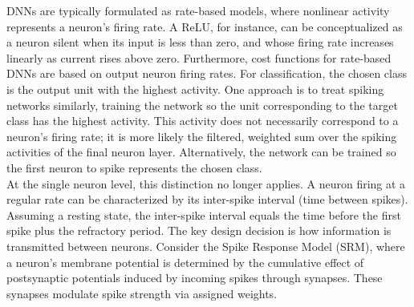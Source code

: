 
\noindent DNNs are typically formulated as rate-based models, where nonlinear activity represents a neuron's firing rate. A ReLU, for instance, can be conceptualized as a neuron silent when its input is less than zero, and whose firing rate increases linearly as current rises above zero. Furthermore, cost functions for rate-based DNNs are based on output neuron firing rates. For classification, the chosen class is the output unit with the highest activity. One approach is to treat spiking networks similarly, training the network so the unit corresponding to the target class has the highest activity. This activity does not necessarily correspond to a neuron's firing rate; it is more likely the filtered, weighted sum over the spiking activities of the final neuron layer. Alternatively, the network can be trained so the first neuron to spike represents the chosen class.\\


\noindent At the single neuron level, this distinction no longer applies. A neuron firing at a regular rate can be characterized by its inter-spike interval (time between spikes). Assuming a resting state, the inter-spike interval equals the time before the first spike plus the refractory period. The key design decision is how information is transmitted between neurons. Consider the Spike Response Model (SRM), where a neuron's membrane potential is determined by the cumulative effect of postsynaptic potentials induced by incoming spikes through synapses. These synapses modulate spike strength via assigned weights.\\

